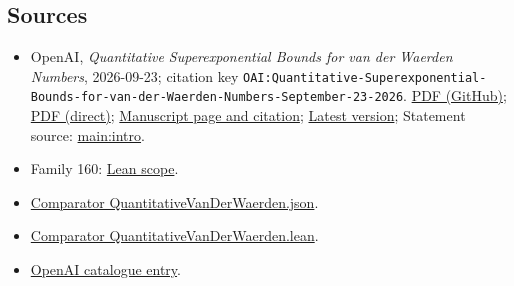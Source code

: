 \documentclass[11pt]{article}
\begin{document}
\subsection{Sources}
\begin{itemize}
\item OpenAI, \emph{Quantitative Superexponential Bounds for van der Waerden Numbers}, 2026-09-23; citation key \texttt{OAI:Quantitative-Superexponential-Bounds-for-van-der-Waerden-Numbers-September-23-2026}. \href{https://github.com/openai/math/blob/adc7f1241b42e322a6451854ab7e4b4c146bf78a/preprints/Quantitative-Superexponential-Bounds-for-van-der-Waerden-Numbers-September-23-2026/paper.pdf}{PDF (GitHub)}; \href{https://github.com/openai/math/raw/adc7f1241b42e322a6451854ab7e4b4c146bf78a/preprints/Quantitative-Superexponential-Bounds-for-van-der-Waerden-Numbers-September-23-2026/paper.pdf}{PDF (direct)}; \href{https://github.com/openai/math/blob/adc7f1241b42e322a6451854ab7e4b4c146bf78a/preprints/Quantitative-Superexponential-Bounds-for-van-der-Waerden-Numbers-September-23-2026/README.md}{Manuscript page and citation}; \href{https://github.com/openai/math/blob/main/preprints/Quantitative-Superexponential-Bounds-for-van-der-Waerden-Numbers-September-23-2026/paper.pdf}{Latest version}; Statement source: \href{https://github.com/openai/math/blob/adc7f1241b42e322a6451854ab7e4b4c146bf78a/preprints/Quantitative-Superexponential-Bounds-for-van-der-Waerden-Numbers-September-23-2026/build/sections/01-introduction.tex\#L18}{main:intro}.
\item Family 160: \href{https://github.com/openai/math/blob/adc7f1241b42e322a6451854ab7e4b4c146bf78a/lean/docs/160.md}{Lean scope}.
\item \href{https://github.com/openai/math/blob/adc7f1241b42e322a6451854ab7e4b4c146bf78a/lean/ComparatorChallenges/QuantitativeVanDerWaerden.json}{Comparator QuantitativeVanDerWaerden.json}.
\item \href{https://github.com/openai/math/blob/adc7f1241b42e322a6451854ab7e4b4c146bf78a/lean/ComparatorChallenges/QuantitativeVanDerWaerden.lean}{Comparator QuantitativeVanDerWaerden.lean}.
\item \href{https://github.com/openai/math/blob/adc7f1241b42e322a6451854ab7e4b4c146bf78a/CONTENTS.md}{OpenAI catalogue entry}.
\end{itemize}
\end{document}
